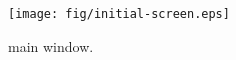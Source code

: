 \begin{figure}[!ht]
\begin{center}
\texttt{[image: fig/initial-screen.eps]}
\caption{\label{fig:jabuti-initial}\toolname main window.}
\end{center}
\end{figure}
